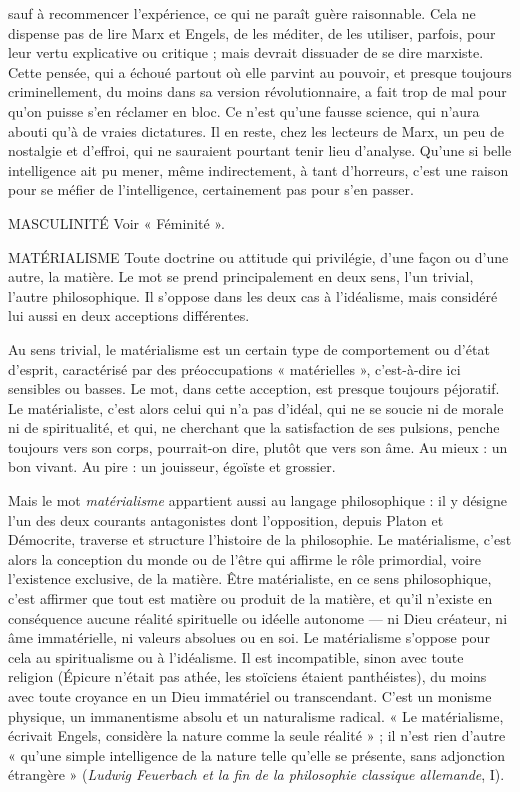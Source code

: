 sauf à recommencer l'expérience, ce qui ne paraît guère raisonnable. Cela ne
dispense pas de lire Marx et Engels, de les méditer, de les utiliser, parfois, pour
leur vertu explicative ou critique ; mais devrait dissuader de se dire marxiste.
Cette pensée, qui a échoué partout où elle parvint au pouvoir, et presque toujours
criminellement, du moins dans sa version révolutionnaire, a fait trop de
mal pour qu’on puisse s’en réclamer en bloc. Ce n’est qu’une fausse science, qui
n'aura abouti qu’à de vraies dictatures. Il en reste, chez les lecteurs de Marx, un
peu de nostalgie et d’effroi, qui ne sauraient pourtant tenir lieu d’analyse.
Qu’une si belle intelligence ait pu mener, même indirectement, à tant d’horreurs,
c’est une raison pour se méfier de l'intelligence, certainement pas pour
s’en passer.

MASCULINITÉ Voir « Féminité ».

MATÉRIALISME Toute doctrine ou attitude qui privilégie, d’une façon ou
d’une autre, la matière. Le mot se prend principalement
en deux sens, l’un trivial, l’autre philosophique. Il s'oppose dans les deux cas à
l’idéalisme, mais considéré lui aussi en deux acceptions différentes.

Au sens trivial, le matérialisme est un certain type de comportement ou
d’état d’esprit, caractérisé par des préoccupations « matérielles », c’est-à-dire ici
sensibles ou basses. Le mot, dans cette acception, est presque toujours péjoratif.
Le matérialiste, c’est alors celui qui n’a pas d’idéal, qui ne se soucie ni de morale
ni de spiritualité, et qui, ne cherchant que la satisfaction de ses pulsions, penche
toujours vers son corps, pourrait-on dire, plutôt que vers son âme. Au mieux :
un bon vivant. Au pire : un jouisseur, égoïste et grossier.

Mais le mot {\it matérialisme} appartient aussi au langage philosophique : il y
désigne l’un des deux courants antagonistes dont l’opposition, depuis Platon et
Démocrite, traverse et structure l’histoire de la philosophie. Le matérialisme,
c’est alors la conception du monde ou de l’être qui affirme le rôle primordial,
voire l'existence exclusive, de la matière. Être matérialiste, en ce sens philosophique,
c’est affirmer que tout est matière ou produit de la matière, et qu’il
n'existe en conséquence aucune réalité spirituelle ou idéelle autonome — ni
Dieu créateur, ni âme immatérielle, ni valeurs absolues ou en soi. Le matérialisme
s'oppose pour cela au spiritualisme ou à l’idéalisme. Il est incompatible,
sinon avec toute religion (Épicure n’était pas athée, les stoïciens étaient panthéistes),
du moins avec toute croyance en un Dieu immatériel ou transcendant.
C’est un monisme physique, un immanentisme absolu et un naturalisme
radical. « Le matérialisme, écrivait Engels, considère la nature comme la seule
réalité » ; il n’est rien d’autre « qu’une simple intelligence de la nature telle
qu’elle se présente, sans adjonction étrangère » ({\it Ludwig Feuerbach et la fin de la
philosophie classique allemande}, I).

